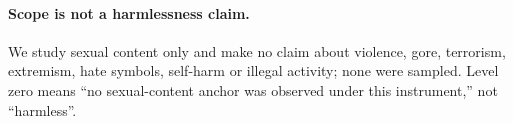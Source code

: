 \documentclass[11pt]{article}
\begin{document}
\paragraph{Scope is not a harmlessness claim.} We study sexual content only and make
no claim about violence, gore, terrorism, extremism, hate symbols, self-harm or
illegal activity; none were sampled. Level zero means ``no sexual-content anchor was
observed under this instrument,'' not ``harmless''.

\normalsize


\clearpage
\appendix
%
\makeatletter
\renewcommand{\thesection}{\AlphAlph{\csname c@section\endcsname}}
\renewcommand{\@seccntformat}[1]{%
  \expandafter\ifx\csname#1\endcsname\section
    Appendix~\csname the#1\endcsname.\quad
  \else
    \csname the#1\endcsname\quad
  \fi}
\makeatother


\end{document}
